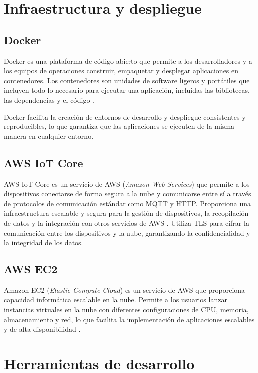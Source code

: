 \section{Infraestructura y despliegue}

\subsection{Docker}

Docker es una plataforma de código abierto que permite a los desarrolladores y
a los equipos de operaciones construir, empaquetar y desplegar aplicaciones en
contenedores. Los contenedores son unidades de software ligeros y portátiles
que incluyen todo lo necesario para ejecutar una aplicación, incluidas las
bibliotecas, las dependencias y el código \cite{Docker}.

Docker facilita la creación de entornos de desarrollo y despliegue consistentes
y reproducibles, lo que garantiza que las aplicaciones se ejecuten de la misma
manera en cualquier entorno.

\subsection{AWS IoT Core}

AWS IoT Core es un servicio de AWS (\textit{Amazon Web Services}) que permite a
los dispositivos conectarse de forma segura a la nube y comunicarse entre sí a
través de protocolos de comunicación estándar como MQTT y HTTP. Proporciona una
infraestructura escalable y segura para la gestión de dispositivos, la
recopilación de datos y la integración con otros servicios de AWS
\cite{AWS_IoT}. Utiliza TLS para cifrar la comunicación entre los dispositivos
y la nube, garantizando la confidencialidad y la integridad de los datos.

\subsection{AWS EC2}

Amazon EC2 (\textit{Elastic Compute Cloud}) es un servicio de AWS que
proporciona capacidad informática escalable en la nube. Permite a los usuarios
lanzar instancias virtuales en la nube con diferentes configuraciones de CPU,
memoria, almacenamiento y red, lo que facilita la implementación de
aplicaciones escalables y de alta disponibilidad \cite{AWS_EC2}.

\section{Herramientas de desarrollo}

